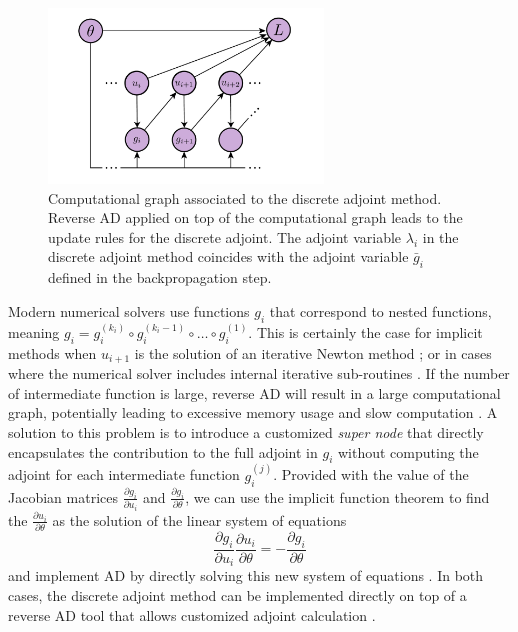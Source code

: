 \begin{figure}[t]
    \centering
    \includegraphics[width=0.65\textwidth]{figures/AD-discrete-adjoint.pdf}
    \caption{Computational graph associated to the discrete adjoint method. Reverse AD applied on top of the computational graph leads to the update rules for the discrete adjoint. The adjoint variable $\lambda_i$ in the discrete adjoint method coincides with the adjoint variable $\bar g_i$ defined in the backpropagation step.}
    \label{fig:ad-vs-discrete-adjoint}
\end{figure}

Modern numerical solvers use functions $g_i$ that correspond to nested functions, meaning $g_i = g_i^{(k_i)} \circ g_i^{(k_i-1)} \circ \ldots \circ g_i^{(1)} $. 
This is certainly the case for implicit methods when $u_{i+1}$ is the solution of an iterative Newton method \cite{SUNDIALS-hindmarsh2005sundials}; or in cases where the numerical solver includes internal iterative sub-routines \cite{Alexe_Sandu_2009}.
If the number of intermediate function is large, reverse AD will result in a large computational graph, potentially leading to excessive memory usage and slow computation \cite{Margossian_2018, Alexe_Sandu_2009}.
A solution to this problem is to introduce a customized \textit{super node} that directly encapsulates the contribution to the full adjoint in $g_i$ without computing the adjoint for each intermediate function $g_i^{(j)}$.
Provided with the value of the Jacobian matrices $\frac{\partial g_i}{\partial u_i}$ and $\frac{\partial g_i}{\partial \theta}$, we can use the implicit function theorem to find 
the $\frac{\partial u_i}{\partial \theta}$ as the solution of the linear system of equations
\begin{equation}
    \frac{\partial g_i}{\partial u_i} \frac{\partial u_i}{\partial \theta} = -\frac{\partial g_i}{\partial \theta}
\end{equation}
and implement AD by directly solving this new system of equations \cite{christianson1994reverse, christianson1998reverse, Bell_Burke_2008}. 
In both cases, the discrete adjoint method can be implemented directly on top of a reverse AD tool that allows customized adjoint calculation \cite{rackauckas2021generalized}. 

